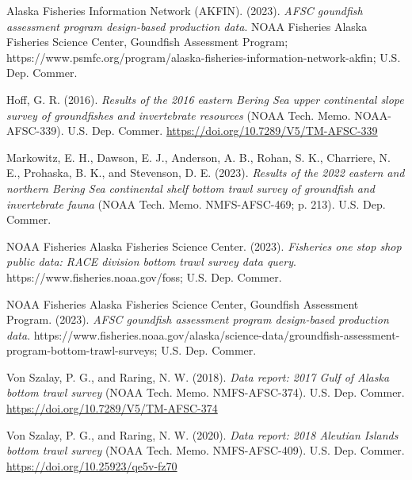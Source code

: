 \documentclass[
  letterpaper,
  oneside,
  open=any]{scrbook}
\newlength{\cslhangindent}
\newlength{\cslentryspacingunit} %
\newenvironment{CSLReferences}[2] %
 {%
  \setlength{\parindent}{0pt}
  \ifodd #1
  \let\oldpar\par
  \def\par{\hangindent=\cslhangindent\oldpar}
  \fi
  \setlength{\parskip}{#2\cslentryspacingunit}
 }%
 {}
\begin{document}
\hypertarget{refs}{}
\begin{CSLReferences}{1}{0}
\leavevmode{}%
Alaska Fisheries Information Network (AKFIN). (2023). \emph{AFSC
goundfish assessment program design-based production data}. {NOAA
Fisheries Alaska Fisheries Science Center, Goundfish Assessment
Program};
https://www.psmfc.org/program/alaska-fisheries-information-network-akfin;
{U.S. Dep. Commer.}

\leavevmode{}%
Hoff, G. R. (2016). \emph{Results of the 2016 eastern {Bering Sea} upper
continental slope survey of groundfishes and invertebrate resources}
(NOAA Tech. Memo. NOAA-AFSC-339). {U.S. Dep. Commer.}
\url{https://doi.org/10.7289/V5/TM-AFSC-339}

\leavevmode{}%
Markowitz, E. H., Dawson, E. J., Anderson, A. B., Rohan, S. K.,
Charriere, N. E., Prohaska, B. K., and Stevenson, D. E. (2023).
\emph{Results of the 2022 eastern and northern {Bering Sea} continental
shelf bottom trawl survey of groundfish and invertebrate fauna} (NOAA
Tech. Memo. NMFS-AFSC-469; p. 213). {U.S. Dep. Commer.}

\leavevmode{}%
NOAA Fisheries Alaska Fisheries Science Center. (2023). \emph{Fisheries
one stop shop public data: RACE division bottom trawl survey data
query}. https://www.fisheries.noaa.gov/foss; {U.S. Dep. Commer.}

\leavevmode{}%
NOAA Fisheries Alaska Fisheries Science Center, Goundfish Assessment
Program. (2023). \emph{AFSC goundfish assessment program design-based
production data}.
https://www.fisheries.noaa.gov/alaska/science-data/groundfish-assessment-program-bottom-trawl-surveys;
{U.S. Dep. Commer.}

\leavevmode{}%
Von Szalay, P. G., and Raring, N. W. (2018). \emph{Data report: 2017
{Gulf of Alaska} bottom trawl survey} (NOAA Tech. Memo. NMFS-AFSC-374).
{U.S. Dep. Commer.} \url{https://doi.org/10.7289/V5/TM-AFSC-374}

\leavevmode{}%
Von Szalay, P. G., and Raring, N. W. (2020). \emph{Data report: 2018
{Aleutian Islands} bottom trawl survey} (NOAA Tech. Memo.
NMFS-AFSC-409). {U.S. Dep. Commer.}
\url{https://doi.org/10.25923/qe5v-fz70}

\end{CSLReferences}


\backmatter
\end{document}
